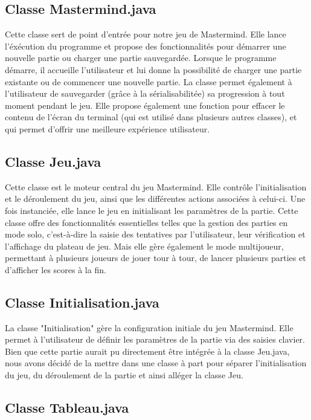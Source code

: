 \documentclass[french]{article}
\begin{document}
\subsection{Classe Mastermind.java}
Cette classe sert de point d'entrée pour notre jeu de Mastermind. Elle lance l'éxécution du programme et propose des fonctionnalités pour démarrer une nouvelle partie ou charger une partie sauvegardée. Lorsque le programme démarre, il accueille l'utilisateur et lui donne la possibilité de charger une partie existante ou de commencer une nouvelle partie. La classe permet également à l'utilisateur de sauvegarder (grâce à la sérialisabilitée) sa progression à tout moment pendant le jeu. Elle propose également une fonction pour effacer le contenu de l'écran du terminal (qui est utilisé dans plusieurs autres classes), et qui permet d'offrir une meilleure expérience utilisateur.

\subsection{Classe Jeu.java}
Cette classe est le moteur central du jeu Mastermind. Elle contrôle l'initialisation et le déroulement du jeu, ainsi que les différentes actions associées à celui-ci. Une fois instanciée, elle lance le jeu en initialisant les paramètres de la partie. Cette classe offre des fonctionnalités essentielles telles que la gestion des parties en mode solo, c'est-à-dire la saisie des tentatives par l'utilisateur, leur vérification et l'affichage du plateau de jeu. Mais elle gère également le mode multijoueur, permettant à plusieurs joueurs de jouer tour à tour, de lancer plusieurs parties et d'afficher les scores à la fin.

\subsection{Classe Initialisation.java}
La classe "Initialisation" gère la configuration initiale du jeu Mastermind. Elle permet à l'utilisateur de définir les paramètres de la partie via des saisies clavier. Bien que cette partie aurait pu directement être intégrée à la classe Jeu.java, nous avons décidé de la mettre dans une classe à part pour séparer l'initialisation du jeu, du déroulement de la partie et ainsi alléger la classe Jeu.

\subsection{Classe Tableau.java}
\end{document}
